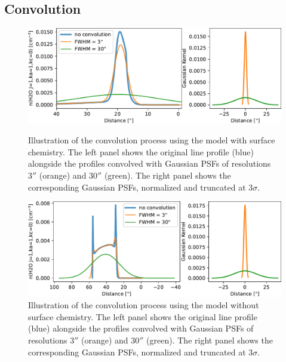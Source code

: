 \documentclass[12pt,a4paper]{article}
\begin{document}
\subsection*{Convolution}
\begin{figure}[h!]
    \centering
    
    \includegraphics[width=.88\textwidth,keepaspectratio]{convolution.pdf}
    \caption{Illustration of the convolution process using the model with surface chemistry. The left panel shows the original line profile (blue) alongside the profiles convolved with Gaussian PSFs of resolutions $3''$ (orange) and $30''$ (green). The right panel shows the corresponding Gaussian PSFs, normalized and truncated at $3\sigma$.} \label{fig:convolution_surfchem}

    \vspace{2em}

    \includegraphics[width=.88\textwidth,keepaspectratio]{convolution_nosurfchem.pdf}
    \caption{Illustration of the convolution process using the model without surface chemistry. The left panel shows the original line profile (blue) alongside the profiles convolved with Gaussian PSFs of resolutions $3''$ (orange) and $30''$ (green). The right panel shows the corresponding Gaussian PSFs, normalized and truncated at $3\sigma$.} \label{fig:convolution_nosurfchem}

\end{figure}

\clearpage
\end{document}
